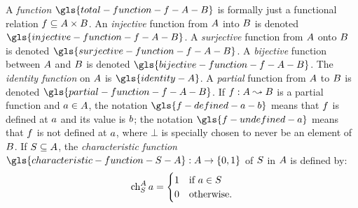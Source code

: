 
A \emph{function}
$\gls{total-function-f-A-B}$ is formally just a functional relation
$f\subseteq A\times B$.
An \emph{injective} function from $A$ into $B$ is denoted
$\gls{injective-function-f-A-B}$.
A \emph{surjective} function from $A$ onto $B$ is denoted
$\gls{surjective-function-f-A-B}$.
A \emph{bijective} function between $A$ and $B$ is denoted
$\gls{bijective-function-f-A-B}$.
The \emph{identity function} on $A$ is $\gls{identity-A}$.
A \emph{partial} function from $A$ to $B$ is denoted
$\gls{partial-function-f-A-B}$. If $f : A \leadsto B$ is a partial
function and $a \in A$, the notation $\gls{f-defined-a-b}$ means that
$f$ is defined at $a$ and its value is $b$;
the notation $\gls{f-undefined-a}$ means that $f$ is not defined at $a$,
where $\bot$ is specially chosen to never be an element of $B$.
If $S \subseteq A$, the \emph{characteristic function}
$\gls{characteristic-function-S-A} : \setA \to \set{0,1}$ of $S$ in $A$
is defined by:
\[
\operatorname{ch}_S^Aa = \begin{cases}
1 &\text{if } a \in S \\
0 &\text{otherwise.}
\end{cases}
\]